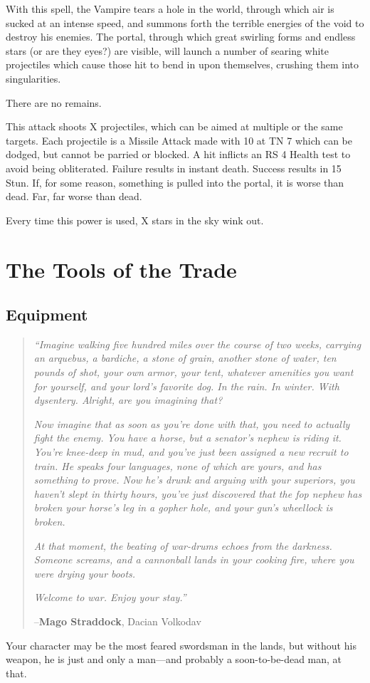 \documentclass[oneside,11pt,english]{book}
\begin{document}
With this spell, the Vampire tears a hole in the world, through which air is sucked at an intense 
speed, and summons forth the terrible energies of the void to destroy his enemies. The portal, 
through which great swirling forms and endless stars (or are they eyes?) are visible, will launch 
a number of searing white projectiles which cause those hit to bend in upon themselves, 
crushing them into singularities. 

There are no remains. 

This attack shoots X projectiles, which can be aimed at multiple or the same targets. Each 
projectile is a Missile Attack made with 10 at TN 7 which can be dodged, but cannot be parried 
or blocked. A hit inflicts an RS 4 Health test to avoid being obliterated. Failure results in instant 
death. Success results in 15 Stun. 
If, for some reason, something is pulled into the portal, it is worse than dead. Far, far worse than 
dead. 

Every time this power is used, X stars in the sky wink out. 

\part[Gear and Equipment]{The Tools of the Trade}
\chapter{Equipment}\label{ch:equipment}
\clearpage
\begin{quotation}
	\emph{“Imagine walking five hundred miles over the course of two weeks, carrying an arquebus, a bardiche, a stone of grain, another stone of water, ten pounds of shot, your own armor, your tent, whatever amenities you want for yourself, and your lord’s favorite dog. In the rain. In winter. With dysentery. Alright, are you imagining that?}

	\emph{Now imagine that as soon as you’re done with that, you need to actually fight the enemy. You have a horse, but a senator’s nephew is riding it. You’re knee-deep in mud, and you’ve just been assigned a new recruit to train. He speaks four languages, none of which are yours, and has something to prove. Now he’s drunk and arguing with your superiors, you haven’t slept in thirty hours, you’ve just discovered that the fop nephew has broken your horse’s leg in a gopher hole, and your gun’s wheellock is broken.}

	\emph{At that moment, the beating of war-drums echoes from the darkness. Someone screams, and a cannonball lands in your cooking fire, where you were drying your boots.}
		
	\emph{Welcome to war. Enjoy your stay.”}

		\hfill--\textbf{Mago Straddock}, Dacian Volkodav
\end{quotation}
Your character may be the most feared swordsman in the lands, but without his weapon, he is just and 
only a man—and probably a soon-to-be-dead man, at that. 
\end{document}
